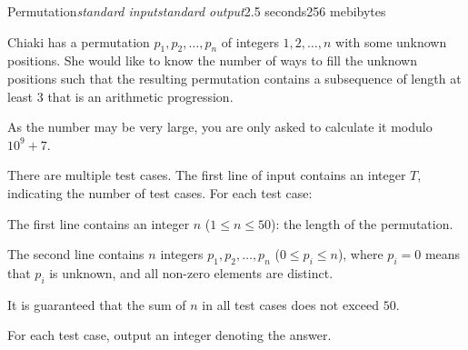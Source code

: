 \begin{problem}{Permutation}{\textsl{standard input}}{\textsl{standard output}}{2.5 seconds}{256 mebibytes}

Chiaki has a permutation $p_1,p_2,\dots,p_n$ of integers $1,2,\dots,n$ with some unknown positions. She would like to know the number of ways to fill the unknown positions such that the resulting permutation contains a subsequence of length at least $3$ that is an arithmetic progression.

As the number may be very large, you are only asked to calculate it modulo $10^9 + 7$.

\InputFile
There are multiple test cases. The first line of input contains an integer $T$, indicating the number of test cases. For each test case:

The first line contains an integer $n$ ($1 \le n \le 50$): the length of the permutation.

The second line contains $n$ integers $p_1,p_2,\dots,p_n$ ($0 \le p_i \le n$), where $p_i=0$ means that $p_i$ is unknown, and all non-zero elements are distinct.

It is guaranteed that the sum of $n$ in all test cases does not exceed $50$.


\OutputFile
For each test case, output an integer denoting the answer.




\Example

\begin{example}
%
\end{example}

\end{problem}
